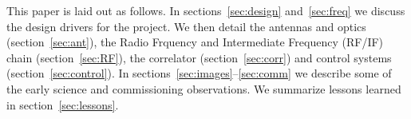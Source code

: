 This paper is laid out as follows. In sections~\ref{sec:design}
and~\ref{sec:freq} we discuss the design drivers for the project. We
then detail the antennas and optics (section~\ref{sec:ant}), the Radio
Frquency and Intermediate Frequency (RF/IF) chain
(section~\ref{sec:RF}), the correlator (section~\ref{sec:corr}) and
control systems (section~\ref{sec:control}). In
sections~\ref{sec:images}--\ref{sec:comm} we describe some of the
early science and commissioning observations. We summarize lessons
learned in section~\ref{sec:lessons}.


